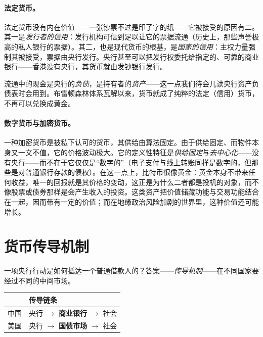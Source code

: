 \paragraph{法定货币。}法定货币没有内在价值——一张钞票不过是印了字的纸——它被接受的原因有二。其一是\emph{发行者的信用}：发行机构可信到足以让它的票据流通（历史上，那些声誉极高的私人银行的票据）。其二，也是现代货币的根基，是\emph{国家的信用}：主权力量强制其被接受，票据由央行发行。央行甚至可以把发行权委托给指定的、可靠的商业银行——香港没有央行，其货币就由发钞银行发行。

流通中的现金是央行的\emph{负债}，是持有者的\emph{资产}——这一点我们待会儿读央行资产负债表时会用到。布雷顿森林体系瓦解以来，货币就成了纯粹的法定（信用）货币，不再可以兑换成黄金。


\paragraph{数字货币与加密货币。}一种加密货币是被私下认可的货币，其供给由算法固定。由于供给固定、而物件本身又一文不值，它的价格波动极大。它的定义性特征是\emph{供给固定}与\emph{去中心化}——没有央行——而不在于它仅仅是“数字的”（电子支付与线上转账同样是数字的，但那些是对普通银行存款的债权）。在这一点上，比特币很像黄金：黄金本身不带来任何收益，唯一的回报就是其价格的变动，这正是为什么二者都是投机的对象，而不像股票或债券那样是会产生收入的投资。这类资产把价值储藏功能与交易功能结合在一起，因而带有一定的价值；而在地缘政治风险加剧的世界里，这种价值还可能增长。

\section{货币传导机制}

一项央行行动是如何抵达一个普通借款人的？答案——\emph{传导机制}——在不同国家要经过不同的中间市场。

\begin{center}
\renewcommand{\arraystretch}{1.4}
\begin{tabular}{@{}ll@{}}
\toprule
& 传导链条 \\
\midrule
中国 & 央行 $\to$ \textbf{商业银行} $\to$ 社会 \\
美国 & 央行 $\to$ \textbf{国债市场} $\to$ 社会 \\
\bottomrule
\end{tabular}
\end{center}

